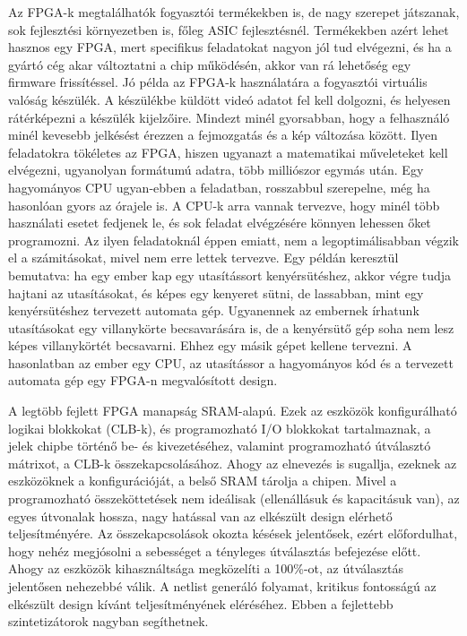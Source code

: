 \documentclass[a4paper,12pt,oneside]{book}
\begin{document}
Az FPGA-k megtalálhatók fogyasztói termékekben is, de nagy szerepet játszanak, sok fejlesztési környezetben is, főleg ASIC fejlesztésnél. Termékekben azért lehet hasznos egy FPGA, mert specifikus feladatokat nagyon jól tud elvégezni, és ha a gyártó cég akar változtatni a chip működésén, akkor van rá lehetőség egy firmware frissítéssel. Jó példa az FPGA-k használatára a fogyasztói virtuális valóság készülék. A készülékbe küldött videó adatot fel kell dolgozni, és helyesen rátérképezni a készülék kijelzőire. Mindezt minél gyorsabban, hogy a felhasználó minél kevesebb jelkésést érezzen a fejmozgatás és a kép változása között. Ilyen feladatokra tökéletes az FPGA, hiszen ugyanazt a matematikai műveleteket kell elvégezni, ugyanolyan formátumú adatra, több milliószor egymás után. Egy hagyományos CPU ugyan-ebben a feladatban, rosszabbul szerepelne, még ha hasonlóan gyors az órajele is. A CPU-k arra vannak tervezve, hogy minél több használati esetet fedjenek le, és sok feladat elvégzésére könnyen lehessen őket programozni. Az ilyen feladatoknál éppen emiatt, nem a legoptimálisabban végzik el a számitásokat, mivel nem erre lettek tervezve. Egy példán keresztül bemutatva: ha egy ember kap egy utasítássort kenyérsütéshez, akkor végre tudja hajtani az utasításokat, és képes egy kenyeret sütni, de lassabban, mint egy kenyérsütéshez tervezett automata gép. Ugyanennek az embernek írhatunk utasításokat egy villanykörte becsavarására is, de a kenyérsütő gép soha nem lesz képes villanykörtét becsavarni. Ehhez egy másik gépet kellene tervezni. A hasonlatban az ember egy CPU, az utasítássor a hagyományos kód és a tervezett automata gép egy FPGA-n megvalósított design.

A legtöbb fejlett FPGA manapság SRAM-alapú. Ezek az eszközök konfigurálható logikai blokkokat (CLB-k), és programozható I/O blokkokat tartalmaznak, a jelek chipbe történő be- és kivezetéséhez, valamint programozható útválasztó mátrixot, a CLB-k összekapcsolásához. Ahogy az elnevezés is sugallja, ezeknek az eszközöknek a konfigurációját, a belső SRAM tárolja a chipen. Mivel a programozható összeköttetések nem ideálisak (ellenállásuk és kapacitásuk van), az egyes útvonalak hossza, nagy hatással van az elkészült design elérhető teljesítményére. Az összekapcsolások okozta késések jelentősek, ezért előfordulhat, hogy nehéz megjósolni a sebességet a tényleges útválasztás befejezése előtt. Ahogy az eszközök kihasználtsága megközelíti a 100\%-ot, az útválasztás jelentősen nehezebbé válik. A netlist generáló folyamat, kritikus fontosságú az elkészült design kívánt teljesítményének eléréséhez. Ebben a fejlettebb szintetizátorok nagyban segíthetnek. 
\fi
\end{document}
